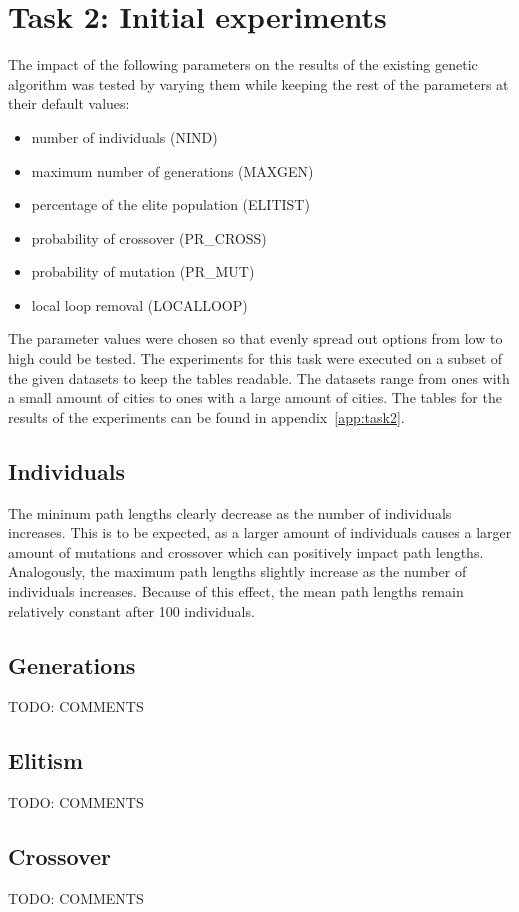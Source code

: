 \documentclass{report}
\begin{document}
\section{Task 2: Initial experiments}
The impact of the following parameters on the results of the existing genetic algorithm was tested by varying them while keeping the rest of the parameters at their default values:
\begin{itemize}
	\item number of individuals (NIND)
	\item maximum number of generations (MAXGEN)
	\item percentage of the elite population (ELITIST)
	\item probability of crossover (PR\_CROSS)
	\item probability of mutation (PR\_MUT)
	\item local loop removal (LOCALLOOP)
\end{itemize}
The parameter values were chosen so that evenly spread out options from low to high could be tested. The experiments for this task were executed on a subset of the given datasets to keep the tables readable. The datasets range from ones with a small amount of cities to ones with a large amount of cities. The tables for the results of the experiments can be found in appendix~\ref{app:task2}.

\subsection{Individuals}
The mininum path lengths clearly decrease as the number of individuals increases. This is to be expected, as a larger amount of individuals causes a larger amount of mutations and crossover which can positively impact path lengths. Analogously, the maximum path lengths slightly increase as the number of individuals increases. Because of this effect, the mean path lengths remain relatively constant after 100 individuals.

\subsection{Generations}
TODO: COMMENTS

\subsection{Elitism}
TODO: COMMENTS

\subsection{Crossover}
TODO: COMMENTS
\end{document}
